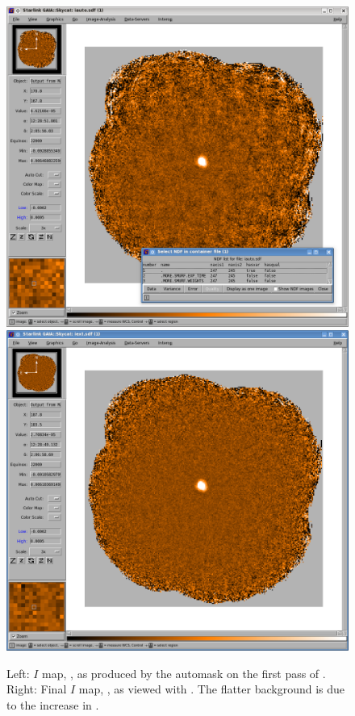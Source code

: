 \begin{figure}[t!]
\begin{center}
\includegraphics[width=0.46\linewidth]{sc22-gaia-view-iauto.png}
\includegraphics[width=0.46\linewidth]{sc22-gaia-view-iext.png}
\label{fig:gaia-iext}
\caption [Final I map in GAIA]{
  \small Left: $I$ map, , as produced by the automask on the first pass
         of \poltwomap. Right: Final $I$ map, , as viewed with \GAIA.
         The flatter background is due to the increase in .
}
\end{center}
\end{figure}


